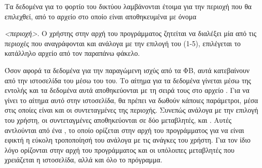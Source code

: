 \documentclass[12pt]{report}
\begin{document}
Τα δεδομένα για το φορτίο του δικτύου λαμβάνονται έτοιμα για την περιοχή που θα επιλεχθεί, από το αρχείο στο οποίο
είναι αποθηκευμένα με όνομα {{}\textit{<περιοχή>}{}. 
Ο χρήστης στην αρχή του προγράμματος ζητείται να διαλέξει μία από τις περιοχές που αναγράφονται και ανάλογα με την
επιλογή του (1-5), επιλέγεται το κατάλληλο αρχείο από τον παραπάνω φάκελο.

{}

Όσον αφορά τα δεδομένα για την παραγώμενη ισχύς από τα ΦΒ, αυτά κατεβαίνουν από την ιστοσελίδα του 
{} μέσω του {} του. Το αίτημα για τα δεδομένα γίνεται 
μέσω της εντολής {} και τα δεδομένα αυτά αποθηκεύονται με τη σειρά τους στο αρχείο {}.
Για να γίνει το αίτημα αυτό στην ιστοσελίδα, θα πρέπει να δωθούν κάποιες παράμετροι, μέσα στις οποίες είναι και οι 
συντεταγμένες της περιοχής. Συνεπώς ανάλογα με την επιλογή του χρήστη, οι συντεταγμένες αποθηκεύονται σε δύο 
μεταβλητές, {} και {}. Αυτές αντλούνται από ένα {}, το οποίο
ορίζεται στην αρχή του προγράμματος για να είναι εφικτή η εύκολη τροποποίησή του ανάλογα με τις ανάγκες του χρήστη.
Για τον ίδιο λόγο ορίζονται στην αρχή του προγράμματος και οι υπόλοιπες μεταβλητές που χρειάζεται η ιστοσελίδα, 
αλλά και όλο το πρόγραμμα.

{}

{}

}
\end{document}
